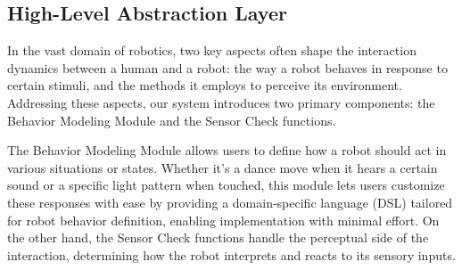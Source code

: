 \documentclass[runningheads]{llncs}
\begin{document}



\subsection{High-Level Abstraction Layer}

In the vast domain of robotics, two key aspects often shape the interaction dynamics between a human and a robot: the way a robot behaves in response to certain stimuli, and the methods it employs to perceive its environment. Addressing these aspects, our system introduces two primary components: the Behavior Modeling Module and the Sensor Check functions.

The Behavior Modeling Module allows users to define how a robot should act in various situations or states. Whether it's a dance move when it hears a certain sound or a specific light pattern when touched, this module lets users customize these responses with ease by providing a domain-specific language (DSL) tailored for robot behavior definition, enabling implementation with minimal effort. On the other hand, the Sensor Check functions handle the perceptual side of the interaction, determining how the robot interprets and reacts to its sensory inputs.
\end{document}
